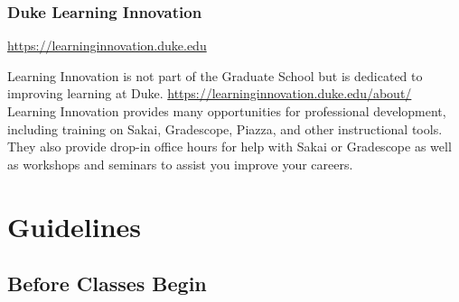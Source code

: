 \documentclass[
]{article}
\begin{document}
\hypertarget{duke-learning-innovation}{%
\subsubsection{Duke Learning Innovation}\label{duke-learning-innovation}}

\url{https://learninginnovation.duke.edu}

Learning Innovation is not part of the Graduate School but is dedicated to improving learning at Duke. \url{https://learninginnovation.duke.edu/about/} Learning Innovation provides many opportunities for professional development, including training on Sakai, Gradescope, Piazza, and other instructional tools. They also provide drop-in office hours for help with Sakai or Gradescope as well as workshops and seminars to assist you improve your careers.

\hypertarget{guidelines}{%
\section{Guidelines}\label{guidelines}}

\hypertarget{before-classes-begin}{%
\subsection{Before Classes Begin}\label{before-classes-begin}}
\end{document}
